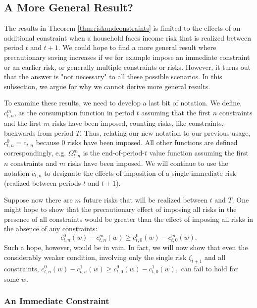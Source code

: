 \documentclass[titlepage]{\econtex}
\begin{document}
\subsection{A More General Result?}
The results in Theorem \ref{thm:riskandconstraints} is limited to the effects of an additional constraint when a household faces income risk that is realized between period $t$ and $t+1$. We could hope to find a more general result where precautionary saving increases if we for example impose an immediate constraint or an earlier risk, or generally multiple constraints or risks. However, it turns out that the answer is "not necessary" to all these possible scenarios. In this subsection, we argue for why we cannot derive more general results.





 To examine these results, we need to develop a last bit of notation.  We define, $c_{t,n}^{m}$, as the consumption function in period $t$ assuming that the first $n$ constraints and the first $m$ risks have been imposed, counting risks, like constraints, backwards from period $T$.  Thus, relating our new notation to our previous usage, $c_{t,n}^{0}=c_{t,n}$ because 0 risks have been imposed. All other functions are defined correspondingly, e.g. $\Omega_{t,n}^{m}$ is the end-of-period-$t$ value function assuming the first $n$ constraints and $m$ risks have been imposed. We will continue to use the notation $\tilde{c}_{t,n}$ to designate the effects of imposition of a single immediate risk (realized between periods $t$ and $t+1$).


Suppose now there are $m$ future risks that will be realized between $t$ and $T$. One might hope to show that the precautionary effect of imposing all risks in the presence of all constraints would be greater than the effect of imposing all risks in the absence of any
constraints:
\begin{equation}
  c_{t,n}^{0}(w) - c_{t,n}^{m}(w) \geq c_{t,0}^{0}(w) - c_{t,0}^{m}(w).\label{eq:nottrue}
\end{equation}
Such a hope, however, would be in vain.  In fact, we will now show that even the considerably weaker condition, involving only the single risk $\zeta_{t+1}$ and all constraints, $c_{t,n}^{0}(w) - c_{t,n}^{1}(w) \geq c_{t,0}^{0}(w) - c_{t,0}^{1}(w),$ can fail to hold for some $w$.


\subsubsection{An Immediate Constraint}\label{subsubsec:ImmediateConstr}
\end{document}
